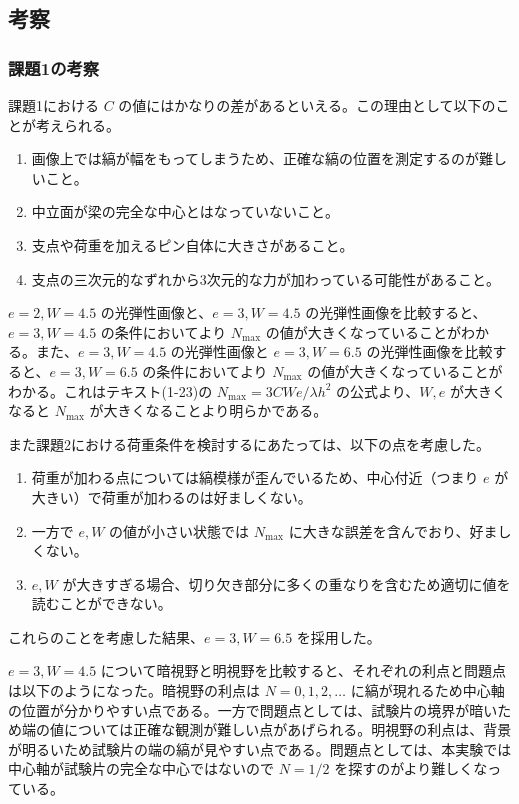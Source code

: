 \documentclass[uplatex,dvipdfmx,titlepage]{jsarticle}
\begin{document}
\subsection{考察}

\subsubsection*{課題1の考察}
課題1における $C$ の値にはかなりの差があるといえる。この理由として以下のことが考えられる。
\begin{enumerate}[label=\arabic*.]
    \item 画像上では縞が幅をもってしまうため、正確な縞の位置を測定するのが難しいこと。
    \item 中立面が梁の完全な中心とはなっていないこと。
    \item 支点や荷重を加えるピン自体に大きさがあること。
    \item 支点の三次元的なずれから3次元的な力が加わっている可能性があること。
\end{enumerate}

$e=2, W=4.5$ の光弾性画像と、$e=3, W=4.5$ の光弾性画像を比較すると、$e=3, W=4.5$ の条件においてより $N_{\text{max}}$ の値が大きくなっていることがわかる。また、$e=3, W=4.5$ の光弾性画像と $e=3, W=6.5$ の光弾性画像を比較すると、$e=3, W=6.5$ の条件においてより $N_{\text{max}}$ の値が大きくなっていることがわかる。これはテキスト(1-23)の $N_{\text{max}}=3CWe/\lambda h^2$ の公式より、$W, e$ が大きくなると $N_{\text{max}}$ が大きくなることより明らかである。

また課題2における荷重条件を検討するにあたっては、以下の点を考慮した。
\begin{enumerate}[label=\arabic*.]
    \item 荷重が加わる点については縞模様が歪んでいるため、中心付近（つまり $e$ が大きい）で荷重が加わるのは好ましくない。
    \item 一方で $e, W$ の値が小さい状態では $N_{\text{max}}$ に大きな誤差を含んでおり、好ましくない。
    \item $e, W$ が大きすぎる場合、切り欠き部分に多くの重なりを含むため適切に値を読むことができない。
\end{enumerate}
これらのことを考慮した結果、$e=3, W=6.5$ を採用した。

$e=3, W=4.5$ について暗視野と明視野を比較すると、それぞれの利点と問題点は以下のようになった。暗視野の利点は $N=0, 1, 2, \dots$ に縞が現れるため中心軸の位置が分かりやすい点である。一方で問題点としては、試験片の境界が暗いため端の値については正確な観測が難しい点があげられる。明視野の利点は、背景が明るいため試験片の端の縞が見やすい点である。問題点としては、本実験では中心軸が試験片の完全な中心ではないので $N=1/2$ を探すのがより難しくなっている。
\end{document}
